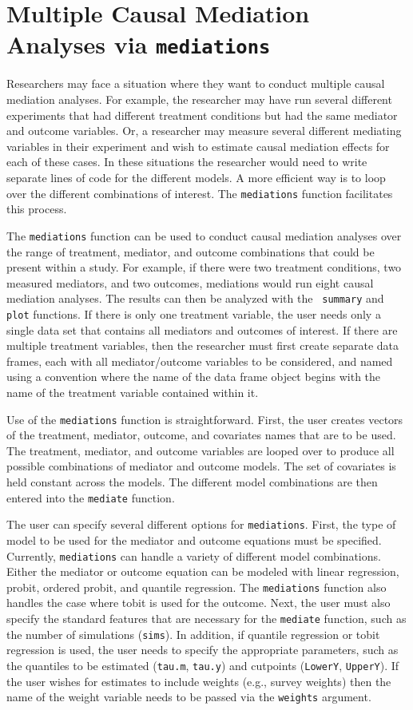\documentclass[11pt,letterpaper]{article}
\theoremstyle{plain}
\begin{document}
\section{Multiple Causal Mediation Analyses via {\tt mediations}}
\label{sec:mediations}
Researchers may face a situation where they want to conduct multiple causal
mediation analyses. For example, the researcher may have run several different
experiments that had different treatment conditions but had the same mediator
and outcome variables. Or, a researcher may measure several different mediating
variables in their experiment and wish to estimate causal mediation effects for
each of these cases. In these situations the researcher would need to write
separate lines of code for the different models. A more efficient way is to
loop over the different combinations of interest.  The {\tt mediations} function
facilitates this process.

The {\tt mediations} function can be used to conduct causal mediation analyses
over the range of treatment, mediator, and outcome combinations that could be
present within a study. For example, if there were two treatment conditions, two
measured mediators, and two outcomes, mediations would run eight causal
mediation analyses. The results can then be analyzed with the {\tt
summary} and {\tt plot} functions. If there is only one
treatment variable, the user needs only a single data set that contains
all mediators and outcomes of interest. If there are multiple treatment
variables, then the researcher must first create separate data frames, each
with all mediator/outcome variables to be considered, and named using a
convention where the name of the data frame object begins with the name of the
treatment variable contained within it.

Use of the {\tt mediations} function is straightforward. First, the user creates
vectors of the treatment, mediator, outcome, and covariates names that are to be used.
The treatment, mediator, and outcome variables are looped over to produce
all possible combinations of mediator and outcome models. The set of covariates
is held constant across the models. The different model combinations are then
entered into the {\tt mediate} function. 

The user can specify several different
options for {\tt mediations}. First, the type of model to be used for the
mediator and outcome equations must be specified. Currently, {\tt mediations} can
handle a variety of different model combinations. Either the mediator or outcome
equation can be modeled with linear regression, probit, ordered probit, and
quantile regression. The {\tt mediations} function also handles the case where tobit is used for
the outcome. Next, the user must also specify the standard features that are necessary for the
{\tt mediate} function, such as the number of simulations ({\tt sims}). In addition, if
quantile regression or tobit regression is used, the user needs to specify 
the appropriate parameters, such as the quantiles to be estimated ({\tt tau.m},
{\tt tau.y}) and cutpoints ({\tt LowerY}, {\tt UpperY}). 
If the user wishes for estimates to include weights
(e.g., survey weights) then the name of the weight variable needs to be passed
via the {\tt weights} argument.
\end{document}
